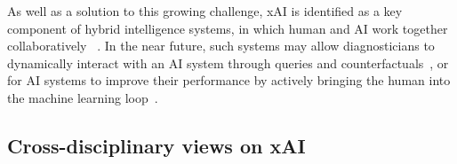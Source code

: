 As well as a solution to this growing challenge, xAI is identified as a key component of hybrid intelligence systems, in which human and AI work together collaboratively ~\cite{hemmer2021human}. In the near future, such systems may allow diagnosticians to dynamically interact with an AI system through queries and counterfactuals~\cite{HolzingerEtAl:2021:GraphFusion}, or for AI systems to improve their performance by actively bringing the human into the machine learning loop~\cite{Holzinger:2020:explainable}.







\subsection{Cross-disciplinary views on xAI}


